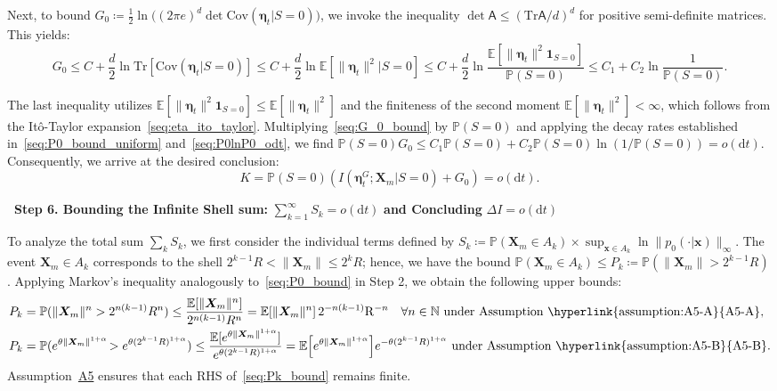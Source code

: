 \documentclass[
 longbibliography,
 twocolumn,
 superscriptaddress,
 amsmath,
 amssymb,
 amsthm,
 amsfonts,
 prl,
 floatfix,
]{revtex4-2}
\newcommand{\matbf}[1]{\boldsymbol{\mathsf{#1}}}
\begin{document}
\begin{widetext}
Next, to bound $G_0\coloneq\frac{1}{2}\ln\!\big((2\pi e)^d\det\mathrm{Cov}(\bm\eta_t|S=0)\big)$, we invoke the inequality $\det\matbf A\leq(\mathrm{Tr}\matbf A/d)^d$ for positive semi-definite matrices. This yields:
\begin{equation}
    G_0\leq
    C+\frac{d}{2}\ln\mathrm{Tr}[\mathrm{Cov}(\bm\eta_t|S=0)]
    \leq
    C+\frac{d}{2}\ln\mathbb E[\|\bm\eta_t\|^2|S=0]
    \leq
    C+\frac{d}{2}\ln\frac{\mathbb E[\|\bm\eta_t\|^2\bm1_{S=0}]}{\mathbb P(S=0)}
    \leq
    C_1+C_2\ln\frac{1}{\mathbb P(S=0)}.
    \label{seq:G_0_bound}
\end{equation}

The last inequality utilizes $\mathbb E[\|\bm\eta_t\|^2\bm1_{S=0}]\leq\mathbb E[\|\bm\eta_t\|^2]$ and the finiteness of the second moment $\mathbb E[\|\bm\eta_t\|^2]<\infty$, which follows from the Itô-Taylor expansion~\eqref{seq:eta_ito_taylor}. Multiplying~\eqref{seq:G_0_bound} by $\mathbb P(S=0)$ and applying the decay rates established in~\eqref{seq:P0_bound_uniform} and~\eqref{seq:P0lnP0_odt}, we find $\mathbb P(S=0)G_0 \leq C_1\mathbb P(S=0)+C_2\mathbb P(S=0)\ln(1/\mathbb P(S=0))=o(\mathrm dt)$. Consequently, we arrive at the desired conclusion:
\begin{equation}
    K=\mathbb P(S=0)(I(\bm\eta_t^G;\bm X_m|S=0)+G_0)=o(\mathrm dt).
    \label{seq:K_odt}
\end{equation}

\bigskip
\noindent\textbf{\textbullet\ Step 6. Bounding the Infinite Shell sum:} $\sum_{k=1}^\infty S_k=o(\mathrm dt)$ \textbf{and Concluding} $\Delta I=o(\mathrm dt)$

To analyze the total sum $\sum_k S_k$, we first consider the individual terms defined by $S_k\coloneq\mathbb P(\bm X_m\in A_k)\times\sup_{\bm x\in A_k}\!\ln\|p_0(\cdot|\bm x)\|_\infty$. The event $\bm X_m\in A_k$ corresponds to the shell $2^{k-1}R<\|\bm X_m\|\leq 2^k R$; hence, we have the bound $\mathbb P(\bm X_m\in A_k)\leq P_k\coloneq\mathbb P(\|\bm X_m\|>2^{k-1}R)$. Applying Markov's inequality analogously to~\eqref{seq:P0_bound} in Step 2, we obtain the following upper bounds:
\begin{subequations}\label{seq:Pk_bound}
\renewcommand{\theequation}{\theparentequation-\Alph{equation}}
\begin{align}
    P_k&=\mathbb P(\|\bm X_m\|^n>2^{n(k-1)}R^n)
    \leq\frac{\mathbb E[\|\bm X_m\|^n]}{2^{n(k-1)}R^n}
    =\mathbb E[\|\bm X_m\|^n]\,2^{-n(k-1)}\mathrm R^{-n}
    \quad\forall n\in\mathbb N
    \text{ under Assumption~\hyperlink{assumption:A5-A}{A5-A}},
    \label{seq:Pk_bound_A}
    \\
    P_k&=\mathbb P(e^{\theta\|\bm X_m\|^{1+\alpha}}\!>e^{\theta (2^{k-1}R)^{1+\alpha}})
    \leq\frac{\mathbb E[e^{\theta\|\bm X_m\|^{1+\alpha}}]}{e^{\theta (2^{k-1}R)^{1+\alpha}}}
    =\mathbb E\!\left[e^{\theta\|\bm X_m\|^{1+\alpha}}\right]
    \!e^{-\theta (2^{k-1}R)^{1+\alpha}}
    \text{ under Assumption~\hyperlink{assumption:A5-B}{A5-B}}.
    \label{seq:Pk_bound_B}
\end{align}
\end{subequations}
Assumption~\hyperlink{assumption:A5}{A5} ensures that each RHS of~\eqref{seq:Pk_bound} remains finite.


\end{widetext}
\end{document}
